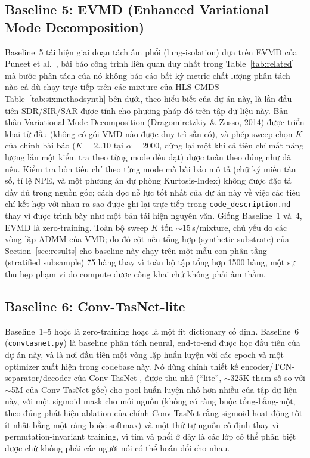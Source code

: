 \documentclass[11pt]{article}
\begin{document}
\subsection{Baseline 5: EVMD (Enhanced Variational Mode Decomposition)}
\label{sec:baseline5}

Baseline~5 tái hiện giai đoạn tách âm phổi (lung-isolation) dựa trên EVMD
của Puneet et al.\ \cite{edgelung}, bài báo công trình liên quan duy nhất
trong Table~\ref{tab:related} mà bước phân tách của nó không báo cáo bất
kỳ metric chất lượng phân tách nào cả dù chạy trực tiếp trên các mixture
của HLS-CMDS --- Table~\ref{tab:sixmethodsynth} bên dưới, theo hiểu biết
của dự án này, là lần đầu tiên SDR/SIR/SAR được tính cho phương pháp đó
trên tập dữ liệu này. Bản thân Variational Mode Decomposition
(Dragomiretzkiy \& Zosso, 2014) được triển khai từ đầu (không có gói VMD
nào được duy trì sẵn có), và phép sweep chọn $K$ của chính bài báo
($K{=}2..10$ tại $\alpha{=}2000$, dừng lại một khi cả tiêu chí mất năng
lượng lẫn một kiểm tra theo từng mode đều đạt) được tuân theo đúng như đã
nêu. Kiểm tra bốn tiêu chí theo từng mode mà bài báo mô tả (chữ ký miền
tần số, tỉ lệ NPE, và một phương án dự phòng Kurtosis-Index) không được
đặc tả đầy đủ trong nguồn gốc; cách đọc nỗ lực tốt nhất của dự án này về
việc các tiêu chí kết hợp với nhau ra sao được ghi lại trực tiếp trong
\texttt{code\_description.md} thay vì được trình bày như một bản tái hiện
nguyên văn. Giống Baseline~1 và~4, EVMD là zero-training. Toàn bộ sweep
$K$ tốn $\sim$15\,s/mixture, chủ yếu do các vòng lặp ADMM của VMD;
do đó cột nền tổng hợp (synthetic-substrate) của Section~\ref{sec:results}
cho baseline này chạy trên một mẫu con phân tầng (stratified subsample)
75 hàng thay vì toàn bộ tập tổng hợp 1500 hàng, một sự thu hẹp phạm vi do
compute được công khai chứ không phải âm thầm.

\subsection{Baseline 6: Conv-TasNet-lite}
\label{sec:baseline6}

Baseline~1--5 hoặc là zero-training hoặc là một fit dictionary cố định.
Baseline~6 (\texttt{convtasnet.py}) là baseline phân tách neural,
end-to-end được học đầu tiên của dự án này, và là nơi đầu tiên một vòng
lặp huấn luyện với các epoch và một optimizer xuất hiện trong codebase
này. Nó dùng chính thiết kế encoder/TCN-separator/decoder của Conv-TasNet
\cite{luomesgarani2019}, được thu nhỏ (``lite'', $\sim$325K tham số so
với $\sim$5M của Conv-TasNet gốc) cho pool huấn luyện nhỏ hơn nhiều của
tập dữ liệu này, với một sigmoid mask cho mỗi nguồn (không có ràng buộc
tổng-bằng-một, theo đúng phát hiện ablation của chính Conv-TasNet rằng
sigmoid hoạt động tốt ít nhất bằng một ràng buộc softmax) và một thứ tự
nguồn cố định thay vì permutation-invariant training, vì tim và phổi ở
đây là các lớp có thể phân biệt được chứ không phải các người nói có thể
hoán đổi cho nhau.
\end{document}
